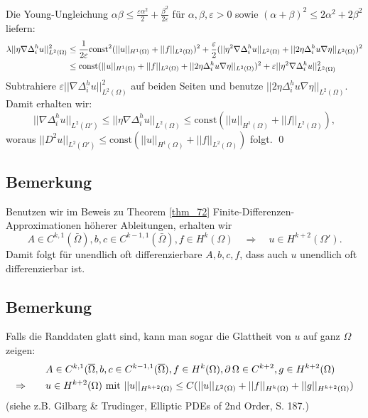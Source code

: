 \begin{enumerate}[1.]
		Die Young-Ungleichung $\alpha \beta \leq \frac{\varepsilon \alpha^2}{2} + \frac{\beta^2}{2\varepsilon}$ für $\alpha, \beta, \varepsilon > 0$ sowie $(\alpha + \beta)^2 \leq 2\alpha^2 + 2\beta^2$ liefern:
		\begin{equation}
		\begin{aligned}
			\lambda ||\eta \nabla \Delta_i^h u||_{L^2(\Omega)}^2 &\leq \frac{1}{2\varepsilon} \text{const}^2(||u||_{H^1(\Omega)} + ||f||_{L^2(\Omega)})^2 + \frac{\varepsilon}{2}(||\eta^2 \nabla \Delta_i^hu||_{L^2(\Omega)} + ||2 \eta \Delta_i^h u \nabla \eta||_{L^2(\Omega)})^2 \\ \notag
			&\leq \text{const}(||u||_{H^1(\Omega)} + ||f||_{L^2(\Omega)} + ||2 \eta \Delta_i^h u \nabla \eta||_{L^2(\Omega)})^2 + \varepsilon||\eta^2 \nabla \Delta_i^hu ||_{L^2(\Omega)}^2
		\end{aligned}
		\end{equation}
		Subtrahiere $\varepsilon ||\nabla \Delta_i^h u||_{L^2(\Omega)}^2$ auf beiden Seiten und benutze $||2 \eta \Delta_i^h u \nabla \eta||_{L^2(\Omega)}$. Damit erhalten wir:
		\[ ||\nabla \Delta_i^h u||_{L^2(\Omega')} \leq ||\eta \nabla \Delta_i^h u||_{L^2(\Omega)} \leq \text{const}(||u||_{H^1(\Omega)} + ||f||_{L^2(\Omega)}), \]
		woraus $||D^2u||_{L^2(\Omega')} \leq \text{const}(||u||_{H^1(\Omega)} + ||f||_{L^2(\Omega)})$ folgt. \qed
	\end{enumerate}
	
\subsection{Bemerkung}
\label{bem_73}
	Benutzen wir im Beweis zu Theorem \ref{thm_72} Finite-Differenzen-Approximationen höherer Ableitungen, erhalten wir \marginnote{[73]}
	\[ A \in C^{k,1}(\bar{\Omega}),b,c \in C^{k-1,1}(\bar{\Omega}),f \in H^k(\Omega) \quad \Rightarrow \quad u \in H^{k+2}(\Omega'). \]
	Damit folgt für unendlich oft differenzierbare $A,b,c,f$, dass auch $u$ unendlich oft differenzierbar ist.
	
\subsection{Bemerkung}
\label{bem_74}
	Falls die Randdaten glatt sind, kann man sogar die Glattheit von $u$ auf ganz $\Omega$ zeigen: \marginnote{[74]}
	\begin{equation}
	\begin{aligned}
		& A \in C^{k,1}(\overline{\Omega}, b,c \in C^{k-1,1}(\overline{\Omega}),f \in H^k(\Omega), \operatorname{\partial}\Omega \in C^{k+2}, g \in H^{k+2}(\Omega) \\ \notag
		\Rightarrow \qquad & u \in H^{k+2}(\Omega) \text{ mit } ||u||_{H^{k+2}(\Omega)} \leq C(||u||_{L^2(\Omega)} + ||f||_{H^k(\Omega)} + ||g||_{H^{k+2}(\Omega)})
	\end{aligned}
	\end{equation}
	(siehe z.B. Gilbarg \& Trudinger, \glqq Elliptic PDEs of 2nd Order\grqq, S. 187.)
\newpage